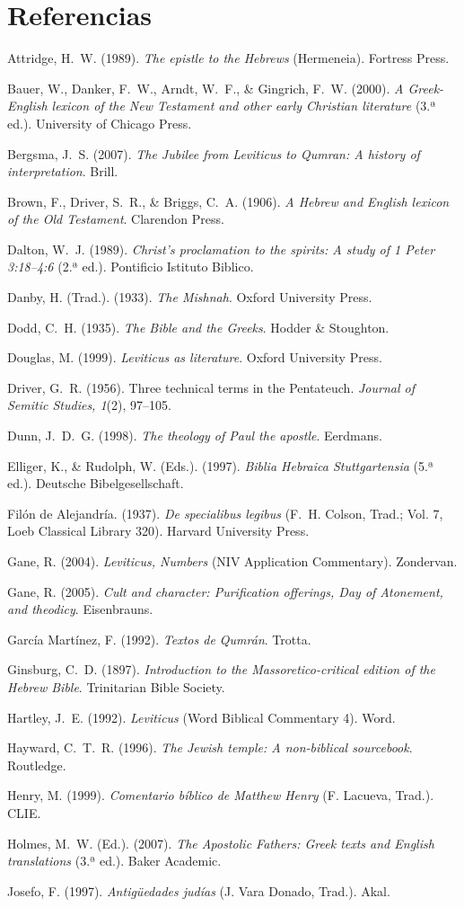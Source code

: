 \documentclass[11pt,letterpaper]{article}
\newcommand{\refapa}[1]{\par{\RaggedRight\hangindent=1.27cm\hangafter=1\noindent #1\par}\vspace{4pt}}
\begin{document}
\section*{Referencias}
\refapa{Attridge, H.~W. (1989). \emph{The epistle to the Hebrews} (Hermeneia). Fortress Press.}
\refapa{Bauer, W., Danker, F.~W., Arndt, W.~F., \& Gingrich, F.~W. (2000). \emph{A Greek-English lexicon of the New Testament and other early Christian literature} (3.ª ed.). University of Chicago Press.}
\refapa{Bergsma, J.~S. (2007). \emph{The Jubilee from Leviticus to Qumran: A history of interpretation}. Brill.}
\refapa{Brown, F., Driver, S.~R., \& Briggs, C.~A. (1906). \emph{A Hebrew and English lexicon of the Old Testament}. Clarendon Press.}
\refapa{Dalton, W.~J. (1989). \emph{Christ's proclamation to the spirits: A study of 1 Peter 3:18--4:6} (2.ª ed.). Pontificio Istituto Biblico.}
\refapa{Danby, H. (Trad.). (1933). \emph{The Mishnah}. Oxford University Press.}
\refapa{Dodd, C.~H. (1935). \emph{The Bible and the Greeks}. Hodder \& Stoughton.}
\refapa{Douglas, M. (1999). \emph{Leviticus as literature}. Oxford University Press.}
\refapa{Driver, G.~R. (1956). Three technical terms in the Pentateuch. \emph{Journal of Semitic Studies, 1}(2), 97--105.}
\refapa{Dunn, J.~D.~G. (1998). \emph{The theology of Paul the apostle}. Eerdmans.}
\refapa{Elliger, K., \& Rudolph, W. (Eds.). (1997). \emph{Biblia Hebraica Stuttgartensia} (5.ª ed.). Deutsche Bibelgesellschaft.}
\refapa{Filón de Alejandría. (1937). \emph{De specialibus legibus} (F.~H. Colson, Trad.; Vol. 7, Loeb Classical Library 320). Harvard University Press.}
\refapa{Gane, R. (2004). \emph{Leviticus, Numbers} (NIV Application Commentary). Zondervan.}
\refapa{Gane, R. (2005). \emph{Cult and character: Purification offerings, Day of Atonement, and theodicy}. Eisenbrauns.}
\refapa{García Martínez, F. (1992). \emph{Textos de Qumrán}. Trotta.}
\refapa{Ginsburg, C.~D. (1897). \emph{Introduction to the Massoretico-critical edition of the Hebrew Bible}. Trinitarian Bible Society.}
\refapa{Hartley, J.~E. (1992). \emph{Leviticus} (Word Biblical Commentary 4). Word.}
\refapa{Hayward, C.~T.~R. (1996). \emph{The Jewish temple: A non-biblical sourcebook}. Routledge.}
\refapa{Henry, M. (1999). \emph{Comentario bíblico de Matthew Henry} (F. Lacueva, Trad.). CLIE.}
\refapa{Holmes, M.~W. (Ed.). (2007). \emph{The Apostolic Fathers: Greek texts and English translations} (3.ª ed.). Baker Academic.}
\refapa{Josefo, F. (1997). \emph{Antigüedades judías} (J. Vara Donado, Trad.). Akal.}
\end{document}
